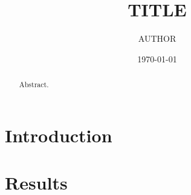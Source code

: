 \documentclass[11pt,a4paper]{scrartcl}
\title{{{TITLE}}}
\author{{{AUTHOR}}}
\date{\today}
\theoremstyle{plain}
\theoremstyle{definition}
\theoremstyle{remark}
\begin{document}
\maketitle
\begin{abstract}
Abstract.
\end{abstract}
\section{Introduction}
\section{Results}


\end{document}
